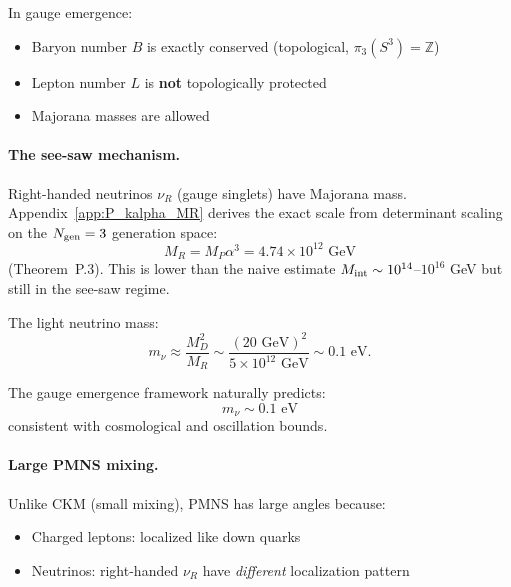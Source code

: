 \begin{theorem}\label{thm:lepton}
In gauge emergence:
\begin{itemize}
\item Baryon number $B$ is exactly conserved (topological, $\pi_3(S^3) = \mathbb{Z}$)
\item Lepton number $L$ is \textbf{not} topologically protected
\item Majorana masses are allowed
\end{itemize}
\end{theorem}

\paragraph{The see-saw mechanism.}
Right-handed neutrinos $\nu_R$ (gauge singlets) have Majorana mass. Appendix~\ref{app:P_kalpha_MR} derives the exact scale from determinant scaling on the $N_{\rm gen} = 3$ generation space:
\begin{equation}
M_R = M_P \alpha^3 = 4.74 \times 10^{12} \text{ GeV}
\end{equation}
(Theorem~P.3). This is lower than the naive estimate $M_{\rm int} \sim 10^{14}$--$10^{16}$ GeV but still in the see-saw regime.

The light neutrino mass:
\begin{equation}
m_\nu \approx \frac{M_D^2}{M_R} \sim \frac{(20 \text{ GeV})^2}{5 \times 10^{12} \text{ GeV}} \sim 0.1 \text{ eV}.
\end{equation}

\begin{corollary}
The gauge emergence framework naturally predicts:
\begin{equation}
\boxed{m_\nu \sim 0.1 \text{ eV}}
\end{equation}
consistent with cosmological and oscillation bounds.
\end{corollary}

\paragraph{Large PMNS mixing.}
Unlike CKM (small mixing), PMNS has large angles because:
\begin{itemize}
\item Charged leptons: localized like down quarks
\item Neutrinos: right-handed $\nu_R$ have \textit{different} localization pattern
\end{itemize}

